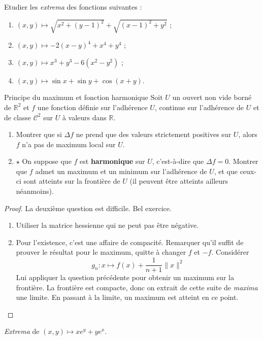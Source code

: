 \documentclass[french,a4paper]{article}
\newcommand{\R}{\mathbb{R}}
\theoremstyle{plain}
\theoremstyle{definition}
\theoremstyle{remark}
\begin{document}
\begin{ex}[Moulin.33]{}
	Etudier les \textit{extrema} des fonctions suivantes :
	\begin{enumerate}
		\item $(x,y)\mapsto\sqrt{x^2+(y-1)^2}+\sqrt{(x-1)^2+y^2}$ ;
		\item $(x,y)\mapsto -2(x-y)^4+x^4+y^4$ ;
		\item $(x,y)\mapsto x^3+y^3-6(x^2-y^2)$ ;
		\item $(x,y)\mapsto \sin x+\sin y+\cos(x+y)$.
	\end{enumerate}
\end{ex}

\begin{ex}[Moulin.34]{Principe du maximum et fonction harmonique}
	Soit $U$ un ouvert non vide borné de $\R^2$ et $f$ une fonction définie sur l'adhérence $U$, continue sur l'adhérence de $U$ et de classe $\mathcal{C}^2$ sur $U$ à valeurs dans $\R$.
	\begin{enumerate}
		\item Montrer que si $\Delta f$ ne prend que des valeurs strictement positives sur $U$, alors $f$ n'a pas de maximum local sur $U$.
		\item $\star$ On suppose que $f$ est \textbf{harmonique} sur $U$, c'est-à-dire que $\Delta f=0$. Montrer que $f$ admet un maximum et un minimum sur l'adhérence de $U$, et que ceux-ci sont atteints sur la frontière de $U$ (il peuvent être atteints ailleurs néanmoins).
	\end{enumerate}
\end{ex}
\begin{proof}
	La deuxième question est difficile. Bel exercice.
	\begin{enumerate}
		\item Utiliser la matrice hessienne qui ne peut pas être négative.
		\item Pour l'existence, c'est une affaire de compacité. Remarquer qu'il suffit de prouver le résultat pour le maximum, quitte à changer $f$ et $-f$. Considérer $$g_n:x\mapsto f(x)+\frac{1}{n+1}\lVert x\rVert^2$$ Lui appliquer la question précédente pour obtenir un maximum sur la frontière. La frontière est compacte, donc on extrait de cette suite de \textit{maxima} une limite. En passant à la limite, un maximum est atteint en ce point.
	\end{enumerate}
\end{proof}

\begin{ex}[Moulin.35]{}
	\textit{Extrema} de $(x,y)\mapsto xe^y+ye^x$.
\end{ex}
\end{document}
